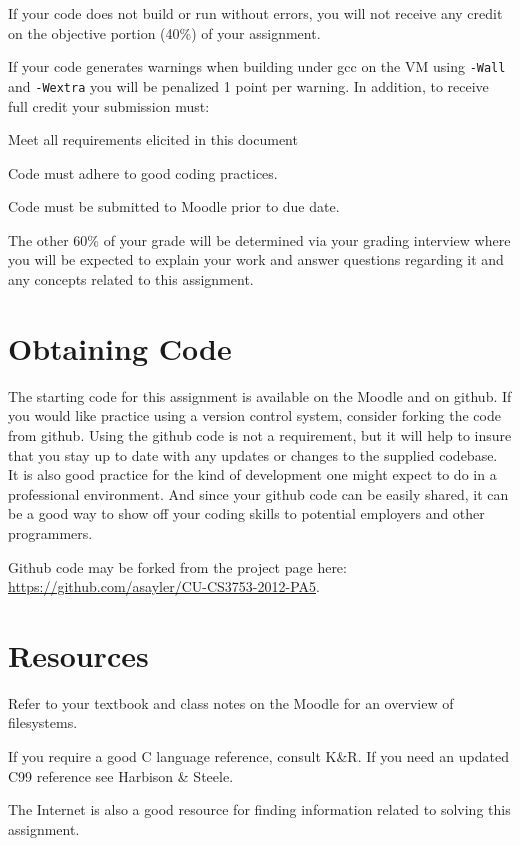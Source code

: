 \documentclass[12pt]{article}
\newenvironment{packed_item}{
\begin{itemize}
  \setlength{\itemsep}{1pt}
  \setlength{\parskip}{0pt}
  \setlength{\parsep}{0pt}
}{\end{itemize}}
\begin{document}
If your code does not build or run without errors, you will not receive
any credit on the objective portion (40\%) of your assignment.

If your code generates warnings when building under gcc on the VM
using \texttt{-Wall} and \texttt{-Wextra} you will be penalized 1
point per warning. In addition, to receive full credit your submission must:
\begin{packed_item}
\item Meet all requirements elicited in this document
\item Code must adhere to good coding practices.
\item Code must be submitted to Moodle prior to due date.
\end{packed_item}

The other 60\% of your grade will be determined via your grading
interview where you will be expected to explain your work and answer
questions regarding it and any concepts related to this assignment.

\section{Obtaining Code}
The starting code for this assignment is available on the Moodle and
on github. If you would like practice using a version control system,
consider forking the code from github. Using the github code is not
a requirement, but it will help to insure that you stay up to date
with any updates or changes to the supplied codebase. It is also
good practice for the kind of development one might expect to do in
a professional environment. And since your github code can be easily
shared, it can be a good way to show off your coding skills to
potential employers and other programmers.

Github code may be forked from the project page here:\\
\url{https://github.com/asayler/CU-CS3753-2012-PA5}.

\section{Resources}
Refer to your textbook and class notes on the Moodle for an overview
of filesystems.

If you require a good C language reference, consult K\&R\cite{K+R}. If
you need an updated C99 reference see Harbison \& Steele\cite{H+S}.

The Internet\cite{tubes} is also a good resource for finding
information related to solving this assignment.
\end{document}
